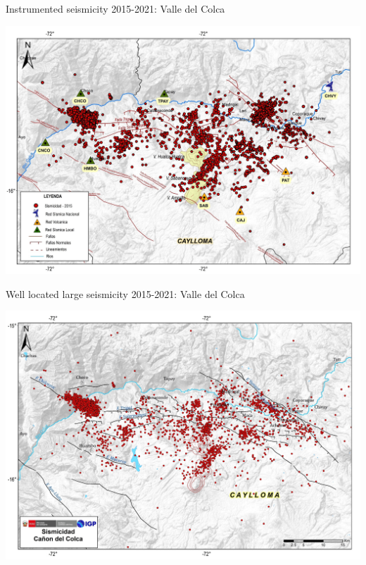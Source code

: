 \documentclass{beamer}
\begin{document}
\begin{frame}
 
 {Instrumented seismicity 2015-2021: Valle del Colca}
 
  \includegraphics[width=1\linewidth]{images/red_colca_all}
 
\end{frame}


\begin{frame}
 
 {Well located large seismicity 2015-2021: Valle del Colca}
 
  \includegraphics[width=1\linewidth]{images/red_colca_large}
 
\end{frame}
\end{document}
